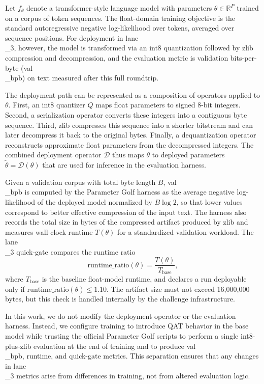 \documentclass{article}
\begin{document}
\label{sec:lane_3_objective_and_deployment_operator}

Let \( f_\theta \) denote a transformer-style language model with parameters \( \theta \in \mathbb{R}^P \) trained on a corpus of token sequences. The float-domain training objective is the standard autoregressive negative log-likelihood over tokens, averaged over sequence positions. For deployment in lane\\_3, however, the model is transformed via an int8 quantization followed by zlib compression and decompression, and the evaluation metric is validation bits-per-byte (val\\_bpb) on text measured after this full roundtrip.

The deployment path can be represented as a composition of operators applied to \( \theta \). First, an int8 quantizer \( Q \) maps float parameters to signed 8-bit integers. Second, a serialization operator converts these integers into a contiguous byte sequence. Third, zlib compresses this sequence into a shorter bitstream and can later decompress it back to the original bytes. Finally, a dequantization operator reconstructs approximate float parameters from the decompressed integers. The combined deployment operator \( \mathcal{D} \) thus maps \( \theta \) to deployed parameters \( \tilde{\theta} = \mathcal{D}(\theta) \) that are used for inference in the evaluation harness.

Given a validation corpus with total byte length \(B\), val\\_bpb is computed by the Parameter Golf harness as the average negative log-likelihood of the deployed model normalized by \(B \log 2\), so that lower values correspond to better effective compression of the input text. The harness also records the total size in bytes of the compressed artifact produced by zlib and measures wall-clock runtime \(T(\theta)\) for a standardized validation workload. The lane\\_3 quick-gate compares the runtime ratio
\[
\mathrm{runtime\_ratio}(\theta) = \frac{T(\theta)}{T_\text{base}},
\]
where \(T_\text{base}\) is the baseline float-model runtime, and declares a run deployable only if \(\mathrm{runtime\_ratio}(\theta) \leq 1.10\). The artifact size must not exceed 16,000,000 bytes, but this check is handled internally by the challenge infrastructure.

In this work, we do not modify the deployment operator or the evaluation harness. Instead, we configure training to introduce QAT behavior in the base model while trusting the official Parameter Golf scripts to perform a single int8-plus-zlib evaluation at the end of training and to produce val\\_bpb, runtime, and quick-gate metrics. This separation ensures that any changes in lane\\_3 metrics arise from differences in training, not from altered evaluation logic.
\end{document}
